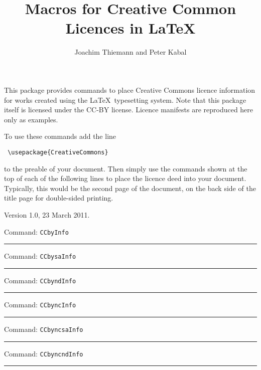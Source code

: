 \documentclass[10pt,letterpaper]{article}
\author{Joachim Thiemann and Peter Kabal}
\title{Macros for Creative Common Licences in \LaTeX}
\newcommand\samplepage[2]{
\newpage \begin{center} Command: {\tt \symbol{92}#1}
\hrule
\end{center} \vspace{1in} #2}
\begin{document}
\maketitle

This package provides commands to place Creative Commons
licence information for works created using the 
\LaTeX\ typesetting system.  Note that this package itself is  
licensed under the CC-BY license.  Licence manifests
are reproduced here only as examples.

To use these commands add the line
\begin{verbatim}
 \usepackage{CreativeCommons}
\end{verbatim}
to the preable of your document.  Then simply use
the commands shown at the top of each of the following
lines to place the licence deed into your document.
Typically, this would be the second page of the document,
on the back side of the title page for double-sided
printing. 

\begin{center}
Version 1.0, 23 March 2011.
\end{center}

\samplepage{CCbyInfo}{\CCbyInfo}
\samplepage{CCbysaInfo}{\CCbysaInfo}
\samplepage{CCbyndInfo}{\CCbyndInfo}
\samplepage{CCbyncInfo}{\CCbyncInfo}
\samplepage{CCbyncsaInfo}{\CCbyncsaInfo}
\samplepage{CCbyncndInfo}{\CCbyncndInfo}
\end{document}
